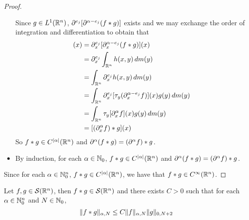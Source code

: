 \documentclass{book}
\begin{document}
\begin{proof}
\begin{itemize}
			Since $g \in L^1(\mathbb{R}^n)$, $\partial^{e_j}[\partial^{\alpha-e_j} (f*g)]$ exists and we may exchange the order of integration and differentiation to obtain that
			\begin{align*}
				[\p_x^{\al}(f*g)](x)
				& = \p^{e_j}_x [\p_x^{\al-e_j} (f*g)](x) \\
				& = \p^{e_j}_x \int_{\R^n} h(x,y) \dm(y) \\
				& = \int_{\R^n} \p^{e_j}_x h(x,y) \dm(y) \\
				& = \int_{\R^n} \p^{e_j}_x [\tau_y (\p_x^{\al-e_j} f)](x)g(y) \dm(y) \\
				& = \int_{\R^n} \tau_y [\p_x^{\al} f](x)g(y) \dm(y) \\
				& = [(\p_x^{\al}f)*g](x) 
			\end{align*}
			So $f*g \in C^{|\alpha|}(\mathbb{R}^n)$ and $\partial^{\alpha}(f*g) = (\partial^{\alpha}f) * g$. 
			\item By induction, for each $\alpha \in \mathbb{N}_0$, $f*g \in C^{|\alpha|}(\mathbb{R}^n)$ and $\partial^{\alpha}(f*g) = (\partial^{\alpha}f) * g$.
			\end{itemize}
			 Since for each $\alpha \in \mathbb{N}_0^n$, $f*g \in C^{|\alpha|}(\mathbb{R}^n)$, we have that $f*g \in C^{\infty}(\mathbb{R}^n)$.
	\end{proof}

	\begin{ex}
		Let $f, g \in \mathcal{S}(\mathbb{R}^n)$, then $f *g \in \mathcal{S}(\mathbb{R}^n)$ and there exists $C >0$ such that for each $\alpha \in \mathbb{N}_0^n$ and $N \in \mathbb{N}_0$, 
		$$\|f*g\|_{\alpha,N} \leq C\|f\|_{\alpha, N} \|g\|_{0, N+2}$$
	\end{ex}
\end{document}
